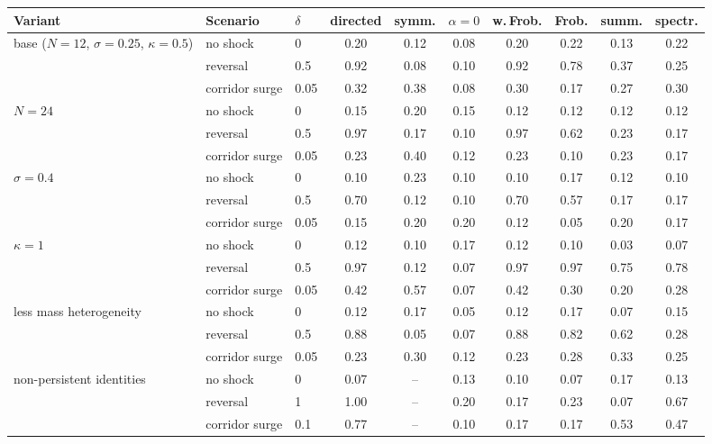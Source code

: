 \begin{tabular}{lllccccccc}
\toprule
Variant & Scenario & $\delta$ & directed & symm. & $\alpha{=}0$ & w.\,Frob. & Frob. & summ. & spectr.\\
\midrule
base ($N{=}12$, $\sigma{=}0.25$, $\kappa{=}0.5$) & no shock & 0 & 0.20 & 0.12 & 0.08 & 0.20 & 0.22 & 0.13 & 0.22\\
 & reversal & 0.5 & 0.92 & 0.08 & 0.10 & 0.92 & 0.78 & 0.37 & 0.25\\
 & corridor surge & 0.05 & 0.32 & 0.38 & 0.08 & 0.30 & 0.17 & 0.27 & 0.30\\
\addlinespace
$N=24$ & no shock & 0 & 0.15 & 0.20 & 0.15 & 0.12 & 0.12 & 0.12 & 0.12\\
 & reversal & 0.5 & 0.97 & 0.17 & 0.10 & 0.97 & 0.62 & 0.23 & 0.17\\
 & corridor surge & 0.05 & 0.23 & 0.40 & 0.12 & 0.23 & 0.10 & 0.23 & 0.17\\
\addlinespace
$\sigma=0.4$ & no shock & 0 & 0.10 & 0.23 & 0.10 & 0.10 & 0.17 & 0.12 & 0.10\\
 & reversal & 0.5 & 0.70 & 0.12 & 0.10 & 0.70 & 0.57 & 0.17 & 0.17\\
 & corridor surge & 0.05 & 0.15 & 0.20 & 0.20 & 0.12 & 0.05 & 0.20 & 0.17\\
\addlinespace
$\kappa=1$ & no shock & 0 & 0.12 & 0.10 & 0.17 & 0.12 & 0.10 & 0.03 & 0.07\\
 & reversal & 0.5 & 0.97 & 0.12 & 0.07 & 0.97 & 0.97 & 0.75 & 0.78\\
 & corridor surge & 0.05 & 0.42 & 0.57 & 0.07 & 0.42 & 0.30 & 0.20 & 0.28\\
\addlinespace
less mass heterogeneity & no shock & 0 & 0.12 & 0.17 & 0.05 & 0.12 & 0.17 & 0.07 & 0.15\\
 & reversal & 0.5 & 0.88 & 0.05 & 0.07 & 0.88 & 0.82 & 0.62 & 0.28\\
 & corridor surge & 0.05 & 0.23 & 0.30 & 0.12 & 0.23 & 0.28 & 0.33 & 0.25\\
\addlinespace
non-persistent identities & no shock & 0 & 0.07 & -- & 0.13 & 0.10 & 0.07 & 0.17 & 0.13\\
 & reversal & 1 & 1.00 & -- & 0.20 & 0.17 & 0.23 & 0.07 & 0.67\\
 & corridor surge & 0.1 & 0.77 & -- & 0.10 & 0.17 & 0.17 & 0.53 & 0.47\\
\bottomrule
\end{tabular}
